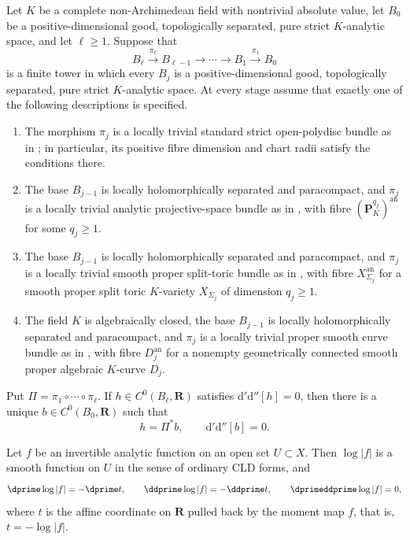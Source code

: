 \begin{proposition}
\label{prop:p062-mixed-exact-bundle-tower-transfer}
Let $K$ be a complete non-Archimedean field with nontrivial absolute
value, let $B_0$ be a positive-dimensional good, topologically separated,
pure strict $K$-analytic space, and let $\ell\geq1$.  Suppose that
\[
 B_\ell\xrightarrow{\pi_\ell}B_{\ell-1}
 \longrightarrow\cdots\longrightarrow B_1
 \xrightarrow{\pi_1}B_0
\]
is a finite tower in which every $B_j$ is a positive-dimensional good,
topologically separated, pure strict $K$-analytic space.  At every stage
assume that exactly one of the following descriptions is specified.
\begin{enumerate}
\item The morphism $\pi_j$ is a locally trivial standard strict
open-polydisc bundle as in
; in particular, its positive
fibre dimension and chart radii satisfy the conditions there.
\item The base $B_{j-1}$ is locally holomorphically separated and
paracompact, and $\pi_j$ is a locally trivial analytic projective-space
bundle as in , with fibre
$(\mathbf P_K^{q_j})^{\mathrm{an}}$ for some $q_j\geq1$.
\item The base $B_{j-1}$ is locally holomorphically separated and
paracompact, and $\pi_j$ is a locally trivial smooth proper split-toric
bundle as in
, with fibre
$X_{\Sigma_j}^{\mathrm{an}}$ for a smooth proper split toric $K$-variety
$X_{\Sigma_j}$ of dimension $q_j\geq1$.
\item The field $K$ is algebraically closed, the base $B_{j-1}$ is locally
holomorphically separated and paracompact, and $\pi_j$ is a locally trivial
proper smooth curve bundle as in
, with fibre
$D_j^{\mathrm{an}}$ for a nonempty geometrically connected smooth proper
algebraic $K$-curve $D_j$.
\end{enumerate}
Put $\Pi=\pi_1\circ\cdots\circ\pi_\ell$.  If
$h\in C^0(B_\ell,\mathbf R)$ satisfies
$\mathrm d'\mathrm d''[h]=0$, then there is a unique
$b\in C^0(B_0,\mathbf R)$ such that
\[
                  h=\Pi^*b,
                  \qquad \mathrm d'\mathrm d''[b]=0.
\]
\end{proposition}

\begin{lemma}
\label{lem:ch15-log-smooth}
Let $f$ be an invertible analytic function on an open set $U\subset X$.
Then $\log|f|$ is a smooth function on $U$ in the sense of ordinary CLD
forms, and
\[
 \dprime\log|f|=-\dprime t,\qquad
 \ddprime\log|f|=-\ddprime t,\qquad
 \dprimeddprime\log|f|=0,
\]
where $t$ is the affine coordinate on $\mathbf R$ pulled back by the moment
map $f$, that is, $t=-\log|f|$.
\end{lemma}


